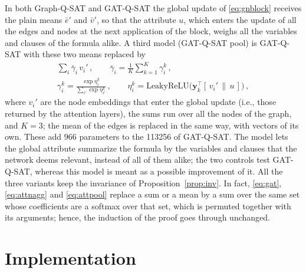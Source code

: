 \documentclass[11pt,a4paper]{article}
\begin{document}
\smallskip
\noindent
In both Graph-Q-SAT and GAT-Q-SAT the global update of \eqref{eq:gnblock}
receives the plain means $\bar e'$ and $\bar v'$, so that the attribute $u$, which
enters the update of all the edges and nodes at the next application of the block,
weighs all the variables and clauses of the formula alike. A third model
(GAT-Q-SAT pool) is GAT-Q-SAT with these two means replaced by
\begin{equation}\label{eq:attpool}
  \begin{gathered}
  \sum_{i} \bar\gamma_i\, v_i' \, , \qquad
  \bar\gamma_i = \frac1K \sum_{k=1}^{K} \gamma^k_i \, ,
  \\
  \gamma^k_i = \frac{\exp \eta^k_i}{\sum_{i'} \exp \eta^k_{i'}} \, , \qquad
  \eta^k_i = \mathrm{LeakyReLU}\big(\mathbf y_k^{\!\top} [\, v_i' \,\|\, u \,]\big) \, ,
  \end{gathered}
\end{equation}
where $v_i'$ are the node embeddings that enter the global update (i.e., those
returned by the attention layers), the sums run over all the nodes of the
graph, and $K = 3$; the mean of the edges is replaced in the same way, with
vectors of its own. These add 966 parameters to the 113256 of GAT-Q-SAT. The
model lets the global attribute summarize the formula by the variables and
clauses that the network deems relevant, instead of all of them alike; the two
controls test GAT-Q-SAT, whereas this model is meant as a possible improvement
of it. All the three variants keep the invariance of
Proposition~\ref{prop:inv}. In fact, \eqref{eq:gat}, \eqref{eq:attnagg} and
\eqref{eq:attpool} replace a sum or a mean by a sum over the same set whose
coefficients are a softmax over that set, which is permuted together with its
arguments; hence, the induction of the proof goes through unchanged.

\section{Implementation}\label{sec:impl}
\end{document}
